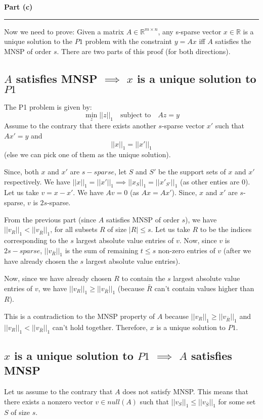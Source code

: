 \documentclass[a4paper,12pt]{article}
\newenvironment{solution}[2][]{%
    \begin{mdframed}[linecolor=blue!70!black, linewidth=2pt, roundcorner=10pt, backgroundcolor=yellow!10!white, skipabove=12pt, skipbelow=12pt]%
        \textbf{\large #2}
        \par\noindent\rule{\textwidth}{0.4pt}
}{
    \end{mdframed}
}
\begin{document}
\begin{solution}{Part (c)}
  Now we need to prove:
  Given a matrix $A \in \mathbb{R}^{m\times n}$, any s-sparse vector $x \in \mathbb{R}$ is a unique solution to the $P1$ problem with the constraint $y = Ax$ iff $A$ satisfies the MNSP of order $s$. There are two parts of this proof (for both directions).

  \subsection*{$A$ satisfies MNSP $\implies$ $x$ is a unique solution to $P1$}
  The P1 problem is given by:
  \[
    \min_{z}||z||_1 \quad \text{subject to} \quad Az = y
  \]
  Assume to the contrary that there exists another $s$-sparse vector $x'$ such that $Ax' = y$ and $$||x||_1 = ||x'||_1$$ (else we can pick one of them as the unique solution). 

  Since, both $x$ and $x'$ are $s-sparse$, let $S$ and $S'$ be the support sets of $x$ and $x'$ respectively. We have $||x||_1 = ||x'||_1 \implies ||x_S||_1 = ||x'_{S'}||_1$ (as other enties are 0). Let us take $v = x - x'$. We have $Av = 0$ (as $Ax = Ax'$). Since, $x$ and $x'$ are $s$-sparse, $v$ is $2s$-sparse. 

  From the previous part (since $A$ satisfies MNSP of order $s$), we have $||v_R||_1 < ||v_{\bar{R}}||_1$, for all subsets $R$ of size $|R| \leq s$. Let us take $R$ to be the indices corresponding to the $s$ largest absolute value entries of $v$. Now, since $v$ is $2s-sparse$, $||v_{\bar{R}}||_1$ is the sum of remaining $t \leq s$ non-zero entries of $v$ (after we have already chosen the $s$ largest absolute value entries).
  
  Now, since we have already chosen $R$ to contain the $s$ largest absolute value entries of $v$, we have $||v_R||_1 \geq ||v_{\bar{R}}||_1$ (because $\bar{R}$ can't contain values higher than $R$). 
  
  This is a contradiction to the MNSP property of $A$ because $||v_R||_1 \geq ||v_{\bar{R}}||_1$ and $||v_R||_1 < ||v_{\bar{R}}||_1$ can't hold together. Therefore, $x$ is a unique solution to $P1$.

  \subsection*{$x$ is a unique solution to $P1$ $\implies$ $A$ satisfies MNSP}
  Let us assume to the contrary that $A$ does not satisfy MNSP. This means that there exists a nonzero vector $v \in null(A)$ such that $||v_S||_1 
  \leq ||v_{\bar{S}}||_1$ for some set $S$ of size $s$. 


\end{solution}
\end{document}

